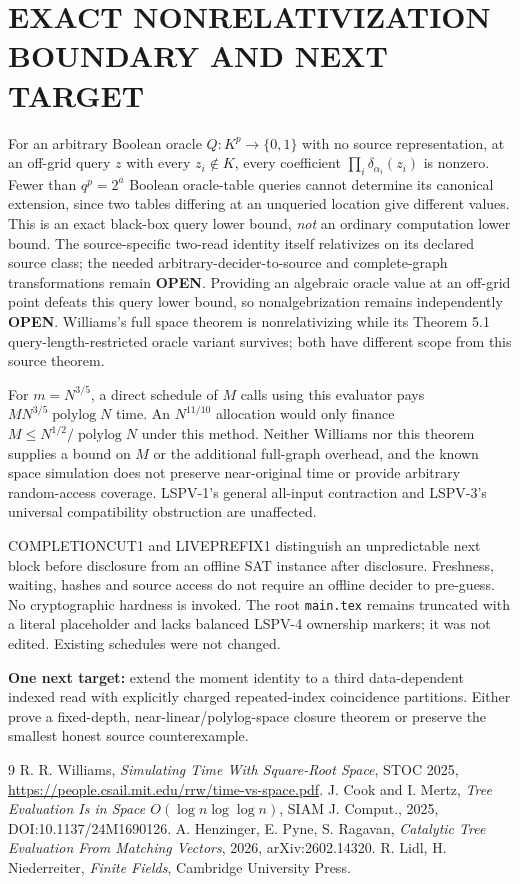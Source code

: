 \documentclass[11pt]{article}
\begin{document}
\section{EXACT NONRELATIVIZATION BOUNDARY AND NEXT TARGET}
For an arbitrary Boolean oracle $Q:K^p\to\{0,1\}$ with no source representation, at an off-grid query $z$ with every $z_i\notin K$, every coefficient $\prod_i\delta_{\alpha_i}(z_i)$ is nonzero. Fewer than $q^p=2^a$ Boolean oracle-table queries cannot determine its canonical extension, since two tables differing at an unqueried location give different values. This is an exact black-box query lower bound, \emph{not} an ordinary computation lower bound. The source-specific two-read identity itself relativizes on its declared source class; the needed arbitrary-decider-to-source and complete-graph transformations remain \textbf{OPEN}. Providing an algebraic oracle value at an off-grid point defeats this query lower bound, so nonalgebrization remains independently \textbf{OPEN}. Williams's full space theorem is nonrelativizing while its Theorem 5.1 query-length-restricted oracle variant survives; both have different scope from this source theorem.

For $m=N^{3/5}$, a direct schedule of $M$ calls using this evaluator pays $M N^{3/5}\operatorname{polylog}N$ time. An $N^{11/10}$ allocation would only finance $M\le N^{1/2}/\operatorname{polylog}N$ under this method. Neither Williams nor this theorem supplies a bound on $M$ or the additional full-graph overhead, and the known space simulation does not preserve near-original time or provide arbitrary random-access coverage. LSPV-1's general all-input contraction and LSPV-3's universal compatibility obstruction are unaffected.

COMPLETIONCUT1 and LIVEPREFIX1 distinguish an unpredictable next block before disclosure from an offline SAT instance after disclosure. Freshness, waiting, hashes and source access do not require an offline decider to pre-guess. No cryptographic hardness is invoked.
The root \texttt{main.tex} remains truncated with a literal placeholder and lacks balanced LSPV-4 ownership markers; it was not edited. Existing schedules were not changed.

\noindent\textbf{One next target:} extend the moment identity to a third data-dependent indexed read with explicitly charged repeated-index coincidence partitions. Either prove a fixed-depth, near-linear/polylog-space closure theorem or preserve the smallest honest source counterexample.

\begin{thebibliography}{9}
 R. R. Williams, \emph{Simulating Time With Square-Root Space}, STOC 2025, \url{https://people.csail.mit.edu/rrw/time-vs-space.pdf}.
 J. Cook and I. Mertz, \emph{Tree Evaluation Is in Space $O(\log n\log\log n)$}, SIAM J. Comput., 2025, DOI:10.1137/24M1690126.
 A. Henzinger, E. Pyne, S. Ragavan, \emph{Catalytic Tree Evaluation From Matching Vectors}, 2026, arXiv:2602.14320.
 R. Lidl, H. Niederreiter, \emph{Finite Fields}, Cambridge University Press.
\end{thebibliography}
\end{document}
